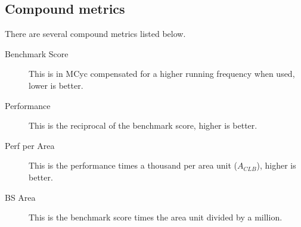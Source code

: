 \documentclass[final]{article}
\begin{document}
\subsection{Compound metrics}
\label{ssec:compound-metrics}
There are several compound metrics listed below.
\begin{description}

    \item[Benchmark Score] This is in MCyc compensated for a higher running frequency when used, lower is better.
    \item[Performance] This is the reciprocal of the benchmark score, higher is better.
    \item[Perf per Area] This is the performance times a thousand per area unit ($A_{CLB}$), higher is better.
    \item[BS Area] This is the benchmark score times the area unit divided by a million.

\end{description}
\end{document}

